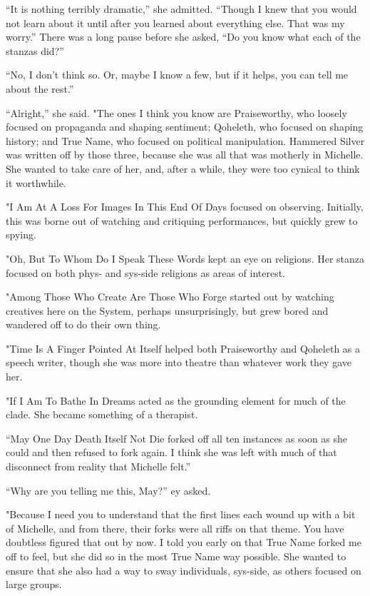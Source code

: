 ``It is nothing terribly dramatic,'' she admitted. ``Though I knew that you would not learn about it until after you learned about everything else. That was my worry.'' There was a long pause before she asked, ``Do you know what each of the stanzas did?''

``No, I don't think so. Or, maybe I know a few, but if it helps, you can tell me about the rest.''

``Alright,'' she said. "The ones I think you know are Praiseworthy, who loosely focused on propaganda and shaping sentiment; Qoheleth, who focused on shaping history; and True Name, who focused on political manipulation. Hammered Silver was written off by those three, because she was all that was motherly in Michelle. She wanted to take care of her, and, after a while, they were too cynical to think it worthwhile.

"I Am At A Loss For Images In This End Of Days focused on observing. Initially, this was borne out of watching and critiquing performances, but quickly grew to spying.

"Oh, But To Whom Do I Speak These Words kept an eye on religions. Her stanza focused on both phys- and sys-side religions as areas of interest.

"Among Those Who Create Are Those Who Forge started out by watching creatives here on the System, perhaps unsurprisingly, but grew bored and wandered off to do their own thing.

"Time Is A Finger Pointed At Itself helped both Praiseworthy and Qoheleth as a speech writer, though she was more into theatre than whatever work they gave her.

"If I Am To Bathe In Dreams acted as the grounding element for much of the clade. She became something of a therapist.

``May One Day Death Itself Not Die forked off all ten instances as soon as she could and then refused to fork again. I think she was left with much of that disconnect from reality that Michelle felt.''

``Why are you telling me this, May?'' ey asked.

"Because I need you to understand that the first lines each wound up with a bit of Michelle, and from there, their forks were all riffs on that theme. You have doubtless figured that out by now. I told you early on that True Name forked me off to feel, but she did so in the most True Name way possible. She wanted to ensure that she also had a way to sway individuals, sys-side, as others focused on large groups.

